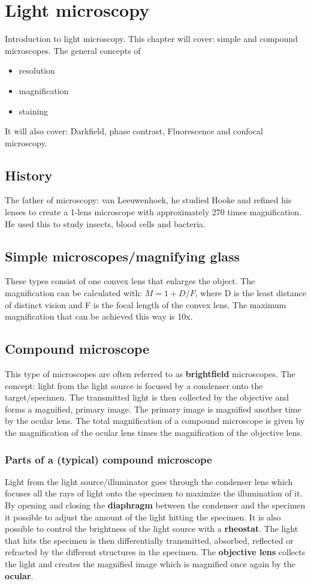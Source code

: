 \section{Light microscopy}
Introduction to light microscopy. This chapter will cover: simple and compound microscopes. The general concepts of 
\begin{itemize}
	\item resolution
	\item magnification
	\item staining
\end{itemize}
It will also cover: Darkfield, phase contrast, Fluorescence and confocal microscopy.

	\subsection{History}
	The father of microscopy: van Leeuwenhoek, he studied Hooke and refined his lenses to create a 1-lens microscope with approximately 270 times magnification. He used this to study insects, blood cells and bacteria. 


	\subsection{Simple microscopes/magnifying glass}
	These types consist of one convex lens that enlarges the object. The magnification can be calculated with: $M = 1 + D/F$, where D is the least distance of distinct vision and F is the focal length of the convex lens. The maximum magnification that can be achieved this way is 10x. 

	\subsection{Compound microscope}
	This type of microscopes are often referred to as \textbf{brightfield} microscopes. The concept: light from the light source is focused by a condenser onto the target/specimen. The transmitted light is then collected by the objective and forms a magnified, primary image. The primary image is magnified another time by the ocular lens. The total magnification of a compound microscope is given by the magnification of the ocular lens times the magnification of the objective lens. 

		\subsubsection{Parts of a (typical) compound microscope}
		Light from the light source/illuminator goes through the condenser lens which focuses all the rays of light onto the specimen to maximize the illumination of it. By opening and closing the \textbf{diaphragm} between the condenser and the specimen it possible to adjust the amount of the light hitting the specimen. It is also possible to control the brightness of the light source with a \textbf{rheostat}. The light that hits the specimen is then differentially transmitted, absorbed, reflected or refracted by the different structures in the specimen. The \textbf{objective lens} collects the light and creates the magnified image which is magnified once again by the \textbf{ocular}. 


